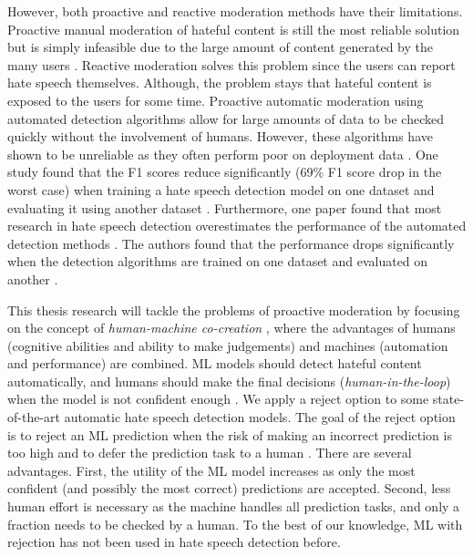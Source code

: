 However, both proactive and reactive moderation methods have their limitations. Proactive manual moderation of hateful content is still the most reliable solution but is simply infeasible due to the large amount of content generated by the many users \citep{balayn2021automatic}. Reactive moderation solves this problem since the users can report hate speech themselves. Although, the problem stays that hateful content is exposed to the users for some time. Proactive automatic moderation using automated detection algorithms allow for large amounts of data to be checked quickly without the involvement of humans. However, these algorithms have shown to be unreliable as they often perform poor on deployment data \citep{balayn2021automatic, grondahl2018all}. One study found that the F1 scores reduce significantly (69\% F1 score drop in the worst case) when training a hate speech detection model on one dataset and evaluating it using another dataset \citep{grondahl2018all}. Furthermore, one paper found that most research in hate speech detection overestimates the performance of the automated detection methods \citep{arango2019hate}. The authors found that the performance drops significantly when the detection algorithms are trained on one dataset and evaluated on another \citep{arango2019hate}.

This thesis research will tackle the problems of proactive moderation by focusing on the concept of \textit{human-machine co-creation} \citep{woo2020future}, where the advantages of humans (cognitive abilities and ability to make judgements) and machines (automation and performance) are combined.
%
%
ML models should detect hateful content automatically, and humans should make the final decisions (\textit{human-in-the-loop}) when the model is not confident enough \citep{woo2020future}.
%
%
We apply a reject option to some state-of-the-art automatic hate speech detection models.
%
The goal of the reject option is to reject an ML prediction when the risk of making an incorrect prediction is too high and to defer the prediction task to a human \citep{hendrickx2021machine}. There are several advantages. First, the utility of the ML model increases as only the most confident (and possibly the most correct) predictions are accepted. Second, less human effort is necessary as the machine handles all prediction tasks, and only a fraction needs to be checked by a human. To the best of our knowledge, ML with rejection has not been used in hate speech detection before.

